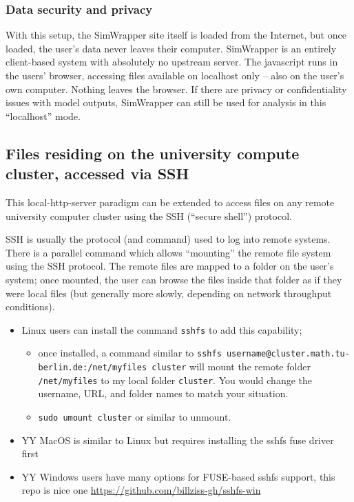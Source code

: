 \documentclass[3p,times,procedia]{elsarticle}
\begin{document}
\subsubsection{Data security and privacy}

With this setup, the SimWrapper site itself is loaded from the Internet,
but once loaded, the user's data never leaves their computer. SimWrapper
is an entirely client-based system with absolutely no upstream server.
The javascript runs in the users' browser, accessing files available on
localhost only -- also on the user's own computer. Nothing leaves the
browser. If there are privacy or confidentiality issues with model
outputs, SimWrapper can still be used for analysis in this ``localhost''
mode.


\subsection{Files residing on the university compute cluster, accessed via SSH}

This local-http-server paradigm can be extended to access files on any
remote university computer cluster using the SSH (``secure shell'')
protocol.

SSH is usually the protocol (and command) used to log into remote
systems. There is a parallel command which allows ``mounting'' the
remote file system using the SSH protocol. The remote files are mapped
to a folder on the user's system; once mounted, the user can browse the
files inside that folder as if they were local files (but generally more
slowly, depending on network throughput conditions).

\begin{itemize}
\item
  Linux users can install the command \texttt{sshfs} to add this
  capability;

  \begin{itemize}
  \item
    once installed, a command similar to
    \texttt{sshfs\ username@cluster.math.tu-berlin.de:/net/myfiles\ cluster}
    will mount the remote folder \texttt{/net/myfiles} to my local
    folder \texttt{cluster}. You would change the username, URL, and
    folder names to match your situation.
  \item
    \texttt{sudo\ umount\ cluster} or similar to unmount.
  \end{itemize}
\item
  YY MacOS is similar to Linux but requires installing the sshfs fuse
  driver first
\item
  YY Windows users have many options for FUSE-based sshfs support, this
  repo is nice one \url{https://github.com/billziss-gh/sshfs-win}
\end{itemize}
\end{document}
